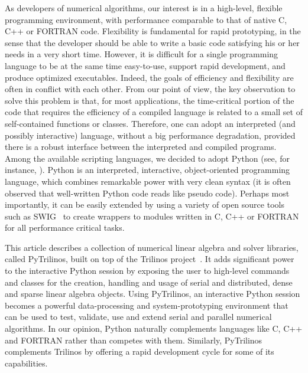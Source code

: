 \documentclass[acmtocl]{acmtrans2m}
\newcommand{\PyTrilinos}{{PyTrilinos}}
\begin{document}
As developers of numerical algorithms, our interest is in a
high-level, flexible programming environment, with performance
comparable to that of native C, C++ or FORTRAN code. Flexibility is
fundamental for rapid prototyping, in the sense that the developer
should be able to write a basic code satisfying his or her needs in a
very short time.  However, it is difficult for a single programming
language to be at the same time
easy-to-use, support rapid development, and produce
optimized executables. Indeed, the goals of efficiency and flexibility
are often in conflict with each other. From our point of view, the key
observation to solve this problem is that, for most applications, the
time-critical portion of the code that requires the efficiency of a
compiled language is related to a small set of self-contained
functions or classes. Therefore, one can adopt an interpreted (and
possibly interactive) language, without a big performance degradation,
provided there is a robust interface between the interpreted and
compiled programs. Among the available scripting languages, we
decided to adopt Python (see, for instance, \cite{python-book}).
Python is an interpreted, interactive, object-oriented programming
language, which combines remarkable power with very clean syntax (it
is often observed that well-written Python code reads like pseudo
code).  Perhaps most importantly, it can be easily extended by using a
variety of open source tools such as SWIG~\cite{swig} to create
wrappers to modules written in C, C++ or FORTRAN for all performance
critical tasks.

This article describes a collection of numerical linear algebra and
solver libraries, called PyTrilinos, built on top of the Trilinos
project~\cite{Trilinos-home-page,Heroux:2005:OTP}.  It adds
significant power to the interactive Python session by exposing the
user to high-level commands and classes for the creation, handling and
usage of serial and distributed, dense and sparse linear algebra
objects. Using \PyTrilinos, an interactive Python session becomes a
powerful data-processing and system-prototyping environment that can
be used to test, validate, use and extend serial and parallel
numerical algorithms. In our opinion, Python naturally complements
languages like C, C++ and FORTRAN rather than competes with them.
Similarly, PyTrilinos complements Trilinos by offering a rapid
development cycle for some of its capabilities.

\end{document}
